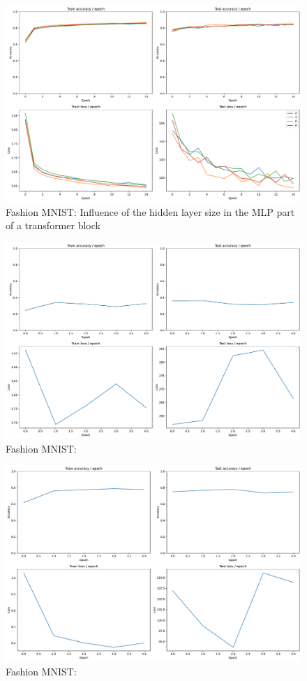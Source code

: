\begin{figure}[H]
    \centering
    \includegraphics*[width=\textwidth]{figs/Transformers/fashion-MNIST/mlp_ratio_influence.pdf}
    \caption{Fashion MNIST: Influence of the hidden layer size in the MLP part of a transformer block}
    \label{fig:fashion:mlp_ratio_influence}
\end{figure}

\begin{figure}[H]
    \centering
    \includegraphics*[width=\textwidth]{figs/Transformers/fashion-MNIST/stats_vit.pdf}
    \caption{Fashion MNIST: }
    \label{fig:fashion:}
\end{figure}

\begin{figure}[H]
    \centering
    \includegraphics*[width=\textwidth]{figs/Transformers/fashion-MNIST/stats_vit_pretrained.pdf}
    \caption{Fashion MNIST: }
    \label{fig:fashion:}
\end{figure}